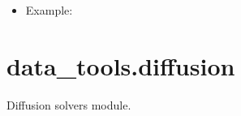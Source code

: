 \documentclass[letterpaper,10pt,english]{sphinxmanual}
\begin{document}
\begin{fulllineitems}
\begin{itemize}
\begin{description}
\end{description}

\item {} \begin{description}
\item[{Example:}] \leavevmode
{}%
\begin{sphinxVerbatim}[commandchars=\\\{\}]
  \PYG{p}{[}  \PYG{p}{]}
\end{sphinxVerbatim}

\end{description}

\end{itemize}

\end{fulllineitems}

\label{\detokenize{diffusion:module-data_tools.diffusion}}

\section{data\_tools.diffusion}
\label{\detokenize{diffusion:data-tools-diffusion}}\label{\detokenize{diffusion::doc}}
Diffusion solvers module.
\end{document}
